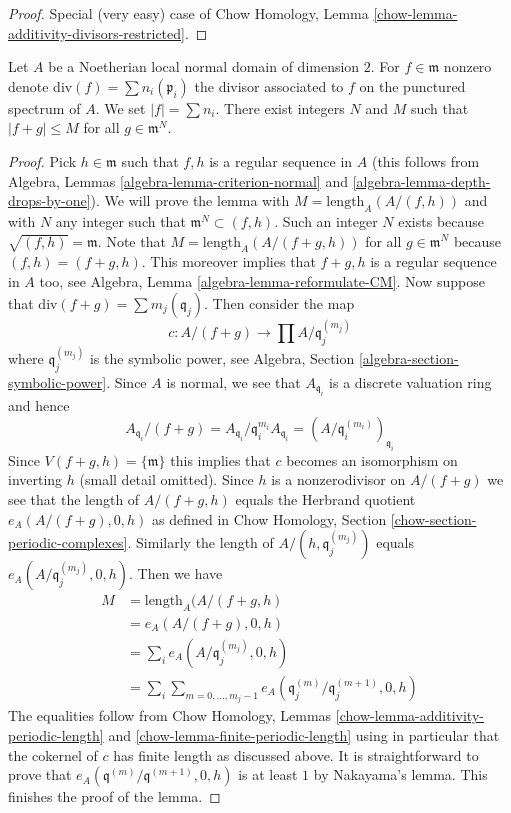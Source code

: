 \begin{proof}
Special (very easy) case of
Chow Homology, Lemma \ref{chow-lemma-additivity-divisors-restricted}.
\end{proof}

\begin{lemma}
\label{lemma-bound-primes}
Let $A$ be a Noetherian local normal domain of dimension $2$.
For $f \in \mathfrak m$ nonzero denote
$\text{div}(f) = \sum n_i (\mathfrak p_i)$
the divisor associated to $f$ on the punctured spectrum of $A$.
We set $|f| = \sum n_i$. There exist integers $N$ and $M$
such that $|f + g| \leq M$ for all $g \in \mathfrak m^N$.
\end{lemma}

\begin{proof}
Pick $h \in \mathfrak m$ such that $f, h$ is a regular sequence in $A$
(this follows from Algebra, Lemmas \ref{algebra-lemma-criterion-normal} and
\ref{algebra-lemma-depth-drops-by-one}).
We will prove the lemma with $M = \text{length}_A(A/(f, h))$ and with
$N$ any integer such that $\mathfrak m^N \subset (f, h)$. Such
an integer $N$ exists because $\sqrt{(f, h)} = \mathfrak m$. Note that
$M = \text{length}_A(A/(f + g, h))$ for all $g \in \mathfrak m^N$
because $(f, h) = (f + g, h)$. This moreover implies that $f + g, h$
is a regular sequence in $A$ too, see
Algebra, Lemma \ref{algebra-lemma-reformulate-CM}.
Now suppose that $\text{div}(f + g ) = \sum m_j (\mathfrak q_j)$.
Then consider the map
$$
c : A/(f + g) \longrightarrow \prod A/\mathfrak q_j^{(m_j)}
$$
where $\mathfrak q_j^{(m_j)}$ is the symbolic power, see
Algebra, Section \ref{algebra-section-symbolic-power}.
Since $A$ is normal, we see that $A_{\mathfrak q_i}$ is
a discrete valuation ring and hence
$$
A_{\mathfrak q_i}/(f + g) =
A_{\mathfrak q_i}/\mathfrak q_i^{m_i} A_{\mathfrak q_i} =
(A/\mathfrak q_i^{(m_i)})_{\mathfrak q_i}
$$
Since $V(f + g, h) = \{\mathfrak m\}$ this implies that $c$ becomes
an isomorphism on inverting $h$ (small detail omitted). Since $h$ is a
nonzerodivisor on $A/(f + g)$ we see that the length of $A/(f + g, h)$
equals the Herbrand quotient $e_A(A/(f + g), 0, h)$
as defined in Chow Homology, Section
\ref{chow-section-periodic-complexes}.
Similarly the length of $A/(h, \mathfrak q_j^{(m_j)})$ equals
$e_A(A/\mathfrak q_j^{(m_j)}, 0, h)$. Then we have
\begin{align*}
M & = \text{length}_A(A/(f + g, h) \\
& =
e_A(A/(f + g), 0, h) \\
& =
\sum\nolimits_i e_A(A/\mathfrak q_j^{(m_j)}, 0, h) \\
& =
\sum\nolimits_i \sum\nolimits_{m = 0, \ldots, m_j - 1}
e_A(\mathfrak q_j^{(m)}/\mathfrak q_j^{(m + 1)}, 0, h)
\end{align*}
The equalities follow from Chow Homology, Lemmas
\ref{chow-lemma-additivity-periodic-length} and
\ref{chow-lemma-finite-periodic-length}
using in particular that
the cokernel of $c$ has finite length as discussed above.
It is straightforward to prove that
$e_A(\mathfrak q^{(m)}/\mathfrak q^{(m + 1)}, 0, h)$
is at least $1$ by Nakayama's lemma. This finishes the proof of the lemma.
\end{proof}

